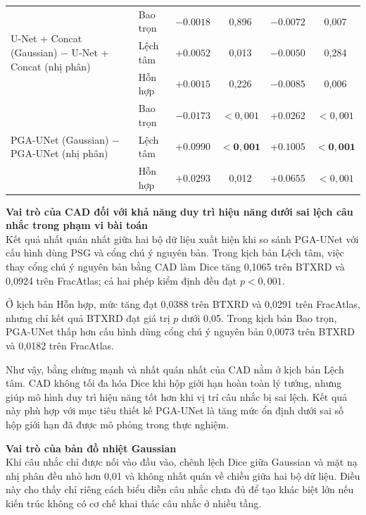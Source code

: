 \begin{table}[H]
{\begin{tabular}{|p{7.5cm}|l|c|c|c|c|}
        \multirow{3}{5.6cm}{U-Net + Concat (Gaussian) $-$ U-Net + Concat (nhị phân)}
        & Bao trọn & $-0.0018$ & 0,896 & $-0.0072$ & 0,007 \\
        & Lệch tâm & $+0.0052$ & 0,013 & $-0.0050$ & 0,284 \\
        & Hỗn hợp & $+0.0015$ & 0,226 & $-0.0085$ & 0,006 \\
        \hline

        \multirow{3}{5.6cm}{PGA-UNet (Gaussian) $-$ PGA-UNet (nhị phân)}
        & Bao trọn & $-0.0173$ & $<0{,}001$ & $+0.0262$ & $<0{,}001$ \\
        & Lệch tâm & $\mathbf{+0.0990}$ & $\mathbf{<0{,}001}$ & $\mathbf{+0.1005}$ & $\mathbf{<0{,}001}$ \\
        & Hỗn hợp & $+0.0293$ & 0,012 & $+0.0655$ & $<0{,}001$ \\
        \hline
    \end{tabular}%
    }
\end{table}

\noindent\textbf{Vai trò của CAD đối với khả năng duy trì hiệu năng dưới sai lệch câu nhắc trong phạm vi bài toán}\\
Kết quả nhất quán nhất giữa hai bộ dữ liệu xuất hiện khi so sánh PGA-UNet với cấu hình dùng PSG và cổng chú ý nguyên bản. Trong kịch bản Lệch tâm, việc thay cổng chú ý nguyên bản bằng CAD làm Dice tăng 0,1065 trên BTXRD và 0,0924 trên FracAtlas; cả hai phép kiểm định đều đạt $p<0{,}001$.

Ở kịch bản Hỗn hợp, mức tăng đạt 0,0388 trên BTXRD và 0,0291 trên FracAtlas, nhưng chỉ kết quả BTXRD đạt giá trị $p$ dưới 0,05. Trong kịch bản Bao trọn, PGA-UNet thấp hơn cấu hình dùng cổng chú ý nguyên bản 0,0073 trên BTXRD và 0,0182 trên FracAtlas.

Như vậy, bằng chứng mạnh và nhất quán nhất của CAD nằm ở kịch bản Lệch tâm. CAD không tối đa hóa Dice khi hộp giới hạn hoàn toàn lý tưởng, nhưng giúp mô hình duy trì hiệu năng tốt hơn khi vị trí câu nhắc bị sai lệch. Kết quả này phù hợp với mục tiêu thiết kế PGA-UNet là tăng mức ổn định dưới sai số hộp giới hạn đã được mô phỏng trong thực nghiệm.

\noindent\textbf{Vai trò của bản đồ nhiệt Gaussian}\\
Khi câu nhắc chỉ được nối vào đầu vào, chênh lệch Dice giữa Gaussian và mặt nạ nhị phân đều nhỏ hơn 0,01 và không nhất quán về chiều giữa hai bộ dữ liệu. Điều này cho thấy chỉ riêng cách biểu diễn câu nhắc chưa đủ để tạo khác biệt lớn nếu kiến trúc không có cơ chế khai thác câu nhắc ở nhiều tầng.

